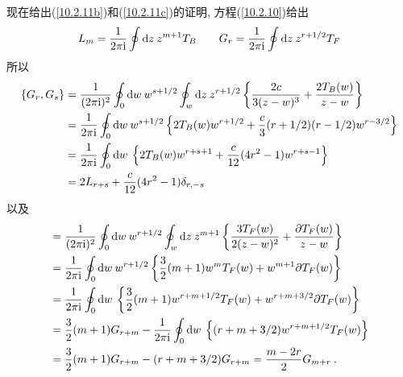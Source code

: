 \begin{tcolorbox}
现在给出(\ref{10.2.11b})和(\ref{10.2.11c})的证明, 方程(\ref{10.2.10})给出
\begin{equation*}
    L_{m}= \frac{1}{2\pi\mathrm{i}}  \oint\mathrm{d} z\: z^{m+1}T_{B} \qquad
    G_{r}=\frac{1}{2\pi\mathrm{i}}  \oint\mathrm{d} z\: z^{r+1/2}T_{F}
\end{equation*}
所以
\begin{align*}
    \{G_{r},G_{s}\} &= \frac{1}{(2\pi\mathrm{i})^{2}} \oint_{0}\mathrm{d} w\: w^{s+1/2} \oint_{w} \mathrm{d} z\:z^{r+1/2}
    \left\{\frac{2c}{3(z-w)^{3}}+\frac{2 T_{B}(w)}{z-w}\right\} \\
     &= \frac{1}{2\pi\mathrm{i}} \oint_{0}\mathrm{d} w\: w^{s+1/2} 
     \left\{2T_{B}(w)w^{r+1/2}+ \frac{c}{3}(r+1/2)(r-1/2)w^{r-3/2}\right\} \\
      &= \frac{1}{2\pi\mathrm{i}} \oint_{0}\mathrm{d} w\: 
     \left\{2T_{B}(w)w^{r+s+1}+ \frac{c}{12}(4r^{2}-1)w^{r+s-1}\right\} \\
     &= 2L_{r+s}+\frac{c}{12}(4r^{2}-1)\delta_{r,-s}
\end{align*}
以及
\begin{align*}
    [L_{m},G_{r}]&= \frac{1}{(2\pi\mi)^{2}} \oint_{0}\dif w\: w^{r+1/2} \oint_{w} \dif z\:z^{m+1}
    \left\{\frac{3T_{F}(w)}{2(z-w)^{2}}+\frac{\partial T_{F}(w)}{z-w}\right\} \\
    &=  \frac{1}{2\pi\mi} \oint_{0}\dif w\: w^{r+1/2}
     \left\{\frac{3}{2}(m+1)w^{m}T_{F}(w)+ w^{m+1}\partial T_{F}(w)\right\} \\
         &=  \frac{1}{2\pi\mi} \oint_{0}\dif w\: 
     \left\{\frac{3}{2}(m+1)w^{r+m+1/2}T_{F}(w)+ w^{r+m+3/2}\partial T_{F}(w)\right\} \\
     &= \frac{3}{2}(m+1) G_{r+m} - \frac{1}{2\pi\mi} \oint_{0}\dif w\:
     \left\{(r+m+3/2)w^{r+m+1/2}T_{F}(w)\right\} \\
     &=\frac{3}{2}(m+1) G_{r+m} - (r+m+3/2)G_{r+m} =\frac{m-2r}{2}G_{m+r} \:.
\end{align*}
\end{tcolorbox}

